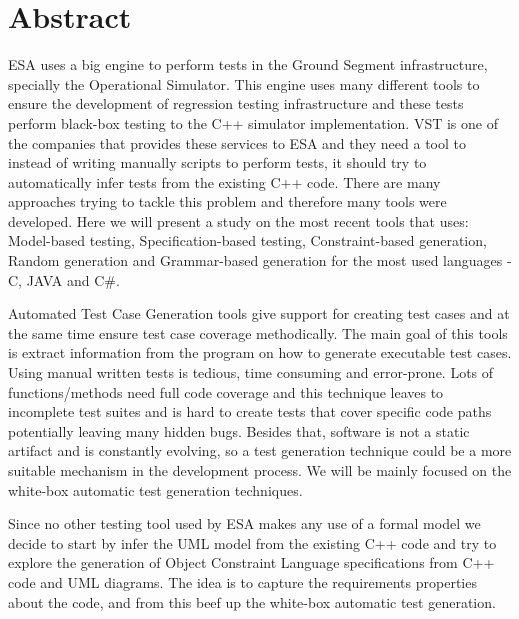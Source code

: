 \chapter*{Abstract}
\ac{ESA} uses a big engine to perform tests in the
Ground Segment infrastructure, specially the Operational Simulator.
This engine uses many different tools to ensure the development of
regression testing infrastructure and these tests perform black-box
testing to the C++ simulator implementation.
\ac{VST} is one of the companies that provides
these services to \ac{ESA} and they need a tool to instead of writing
manually scripts to perform tests, it should try to automatically
infer tests from the existing C++ code.
There are many approaches trying to tackle this problem and therefore
many tools were developed. Here we will present a study on the most
recent tools that uses: Model-based testing, Specification-based
testing, Constraint-based generation, Random generation and
Grammar-based generation for the most used languages - C, JAVA and C\#.

Automated Test Case Generation tools give support for creating test
cases and at the same time ensure test case coverage methodically. The
main goal of this tools is extract information from the program on how
to generate executable test cases.
Using manual written tests is tedious, time consuming and error-prone.
Lots of functions/methods need full code coverage and this technique
leaves to incomplete test suites and is hard to create tests that
cover specific code paths potentially leaving many hidden bugs.
Besides that, software is not a static artifact and is constantly
evolving, so a test generation technique could be a more suitable
mechanism in the development process.
We will be mainly focused on the white-box automatic test generation techniques.

Since no other testing tool used by \ac{ESA} makes any use of a formal
model we decide to start by infer the \ac{UML} model from the existing C++
code and try to explore the generation of Object Constraint Language specifications
from C++ code and \ac{UML} diagrams. The idea is to capture the requirements properties about the code, and from this beef up the white-box automatic test generation.

